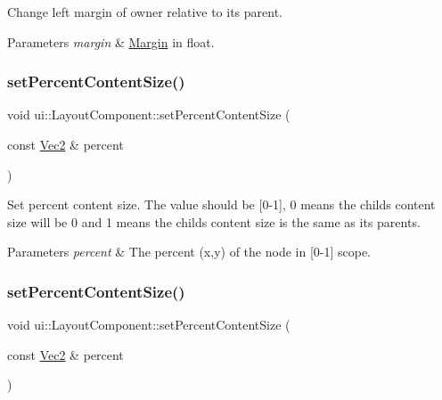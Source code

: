 Change left margin of owner relative to its parent. 
\begin{DoxyParams}{Parameters}
{\em margin} & \hyperlink{classui_1_1Margin}{Margin} in float. \\
\hline
\end{DoxyParams}
\mbox{\label{classui_1_1LayoutComponent_ac1b75e3b3340dfeead80af4bc6732ef5}} 
\subsubsection{\texorpdfstring{set\+Percent\+Content\+Size()}{setPercentContentSize()}\hspace{0.1cm}{\footnotesize\ttfamily [1/2]}}
{\footnotesize\ttfamily void ui\+::\+Layout\+Component\+::set\+Percent\+Content\+Size (\begin{DoxyParamCaption}\item[{const \hyperlink{classVec2}{Vec2} \&}]{percent }\end{DoxyParamCaption})}

Set percent content size. The value should be \mbox{[}0-\/1\mbox{]}, 0 means the child\textquotesingle{}s content size will be 0 and 1 means the child\textquotesingle{}s content size is the same as its parents. 
\begin{DoxyParams}{Parameters}
{\em percent} & The percent (x,y) of the node in \mbox{[}0-\/1\mbox{]} scope. \\
\hline
\end{DoxyParams}
\mbox{\label{classui_1_1LayoutComponent_ac1b75e3b3340dfeead80af4bc6732ef5}} 
\subsubsection{\texorpdfstring{set\+Percent\+Content\+Size()}{setPercentContentSize()}\hspace{0.1cm}{\footnotesize\ttfamily [2/2]}}
{\footnotesize\ttfamily void ui\+::\+Layout\+Component\+::set\+Percent\+Content\+Size (\begin{DoxyParamCaption}\item[{const \hyperlink{classVec2}{Vec2} \&}]{percent }\end{DoxyParamCaption})}


